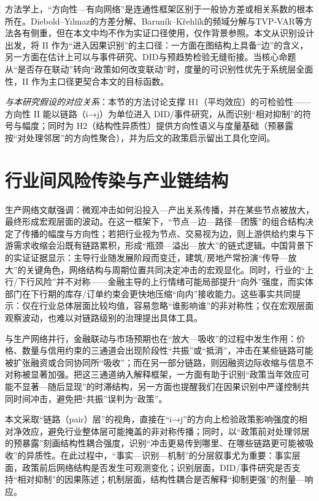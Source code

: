 方法学上，“方向性—有向网络”是连通性框架区别于一般协方差或相关系数的根本所在。Diebold–Yılmaz的方差分解、Baruník–Křehlík的频域分解与TVP‑VAR等方法各有侧重，但在本文中均不作为实证口径使用，仅作背景参照。本文从识别设计出发，将 II 作为“进入因果识别”的主口径：一方面在图结构上具备“边”的含义，另一方面在估计上可以与事件研究、DID与预趋势检验无缝衔接。当核心命题从“是否存在联动”转向“政策如何改变联动”时，度量的可识别性优先于系统层全面性，II 作为主口径更契合本文的目标函数。

\noindent\textit{与本研究假设的对应关系}：本节的方法讨论支撑 H1（平均效应）的可检验性——方向性 II 能以链路（i→j）为单位进入 DID/事件研究，从而识别“相对抑制”的符号与幅度；同时为 H2（结构性异质性）提供方向性语义与度量基础（预暴露按“对处理邻居”的方向性聚合），并为后文的政策启示留出工具化空间。
\section{行业间风险传染与产业链结构}
生产网络文献强调：微观冲击如何沿投入—产出关系传播，并在某些节点被放大，最终形成宏观层面的波动\citep{acemoglu2012network,carvalho2014micro}。在这一框架下，“节点—边—路径—团簇”的组合结构决定了传播的幅度与方向性；若把行业视为节点、交易视为边，则上游供给约束与下游需求收缩会沿既有链路累积，形成“瓶颈—溢出—放大”的链式逻辑。中国背景下的实证证据显示：主导行业随发展阶段而变迁，建筑/房地产常扮演“传导—放大”的关键角色，网络结构与周期位置共同决定冲击的宏观显化\citep{huang2024network}。同时，行业的“上行/下行风险”并不对称——金融主导的上行情绪可能局部提升“向外”强度，而实体部门在下行期的库存/订单约束会更快地压缩“向内”接收能力\citep{lizheng2024updown}。这些事实共同提示：仅在行业总体层面比较均值，容易忽略“谁影响谁”的非对称性；仅在宏观层面观察波动，也难以对链路级别的治理提出具体工具。

与生产网络并行，金融联动与市场预期也在“放大—吸收”的过程中发生作用：价格、数量与信用约束的三通道会出现阶段性“共振”或“抵消”，冲击在某些链路可能被扩张融资或合同协同所“吸收”；而在另一部分链路，则因融资边际收缩与信息不对称被显著加强。把这三通道纳入解释框架，一方面有助于识别“政策当年效应可能不显著—随后显现”的时滞结构，另一方面也提醒我们在因果识别中严谨控制共同时间冲击，避免把“共振”误判为“政策”。

本文采取“链路（pair）层”的视角，直接在“i→j”的方向上检验政策影响强度的相对净效应，避免行业整体层可能掩盖的非对称传播；同时，以“政策前对处理邻居的预暴露”刻画结构性耦合强度，识别“冲击更易传到哪里、在哪些链路更可能被吸收”的异质性。在此过程中，“事实—识别—机制”的分层叙事尤为重要：事实层面，政策前后网络结构是否发生可观测变化；识别层面，DID/事件研究是否支持“相对抑制”的因果陈述；机制层面，结构性耦合是否解释“抑制更强”的剂量—响应。

